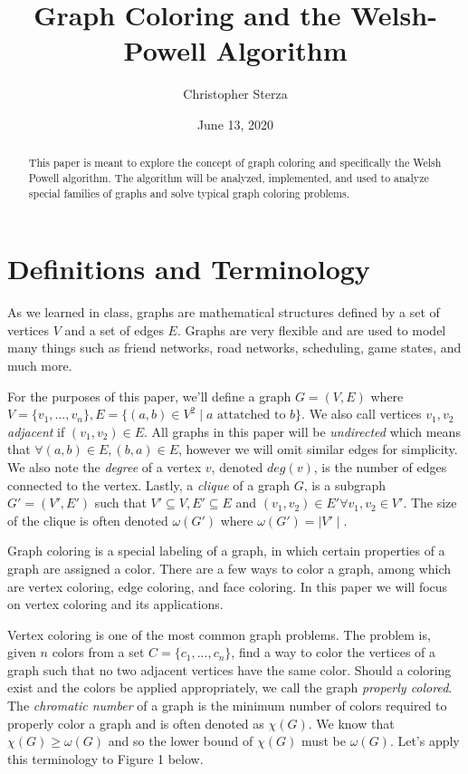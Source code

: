 \documentclass[12pt, letterpaper]{article}
\title{Graph Coloring and the Welsh-Powell Algorithm}
\author{Christopher Sterza}
\date{June 13, 2020}
\begin{document}
\begin{titlepage}
\maketitle
\end{titlepage}


\begin{abstract}
This paper is meant to explore the concept of graph coloring and specifically the Welsh Powell algorithm. The algorithm will be analyzed, implemented, and used to analyze special families of graphs and solve typical graph coloring problems. 
\end{abstract}
\section*{Definitions and Terminology}
As we learned in class, graphs are mathematical structures defined by a set of vertices $V$ and a set of edges $E$. Graphs are very flexible and are used to model many things such as friend networks, road networks, scheduling, game states, and much more.


For the purposes of this paper, we'll define a graph $G=(V,E)$ where $V=\{v_1,...,v_n\}, E=\{(a,b) \in V^2\mid a\text{ attatched to } b\}$. We also call vertices $v_1,v_2$ \textit{adjacent} if $(v_1,v_2)\in E$. All graphs in this paper will be \textit{undirected} which means that $\forall (a,b)\in E,(b,a)\in E$, however we will omit similar edges for simplicity. We also note the \textit{degree} of a vertex $v$, denoted $deg(v)$, is the number of edges connected to the vertex. Lastly, a \textit{clique} of a graph $G$, is a subgraph $G'=(V',E')$ such that $V'\subseteq V,E'\subseteq E$ and $(v_1,v_2)\in E' \forall v_1,v_2 \in V'$. The size of the clique is often denoted $\omega(G')$ where $\omega(G')= \mid V' \mid$.


Graph coloring is a special labeling of a graph, in which certain properties of a graph are assigned a color. There are a few ways to color a graph, among which are vertex coloring, edge coloring, and face coloring. In this paper we will focus on vertex coloring and its applications.


Vertex coloring is one of the most common graph problems. The problem is, given $n$ colors from a set $C=\{c_1,...,c_n\}$, find a way to color the vertices of a graph such that no two adjacent vertices have the same color. Should a coloring exist and the colors be applied appropriately, we call the graph \textit{properly colored}. The \textit{chromatic number} of a graph is the minimum number of colors required to properly color a graph and is often denoted as $\chi (G)$. We know that $\chi(G)\geq \omega(G)$\cite{nistmath} and so the lower bound of $\chi(G)$ must be $\omega(G)$. Let's apply this terminology to Figure 1 below.
\end{document}
